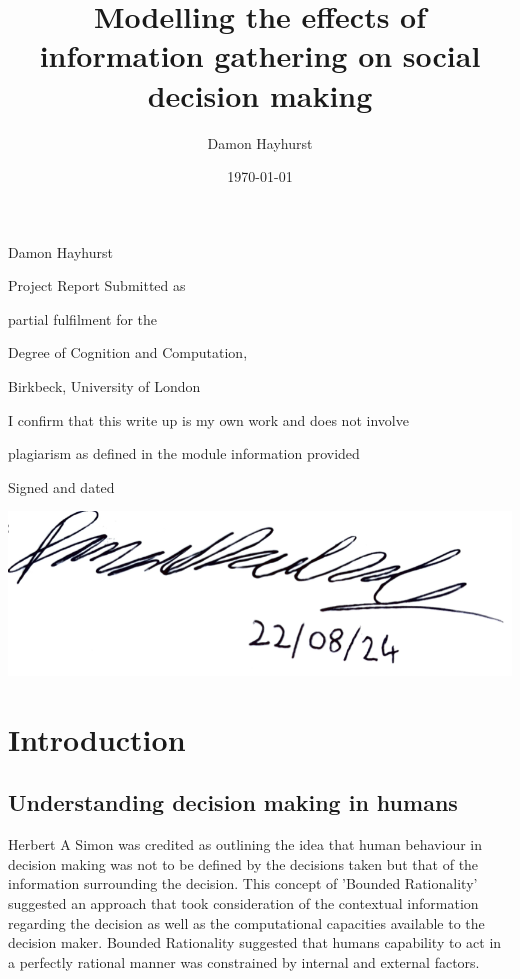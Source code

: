 \documentclass[man, floatsintext]{apa7}
\title{Modelling the effects of information gathering on social decision making}
\author{Damon Hayhurst}
\date{\today}
\makeatletter
\renewcommand{\maketitle}{
	\begin{titlepage}
		\centering
		\vspace*{0.4in}
		{\Huge \bfseries \@title \par}
		\vspace{0.2in}
		{\LARGE Damon Hayhurst \par}
		\vspace{0.3in}
		{\Large Project Report Submitted as\par}
		{\Large partial fulfilment for the\par}
		{\Large Degree of Cognition and Computation,\par}
		\vfill
		{\Large Birkbeck, University of London\par}
		{\Large \@date \par}
		\vfill
		{\Large
			\begin{center}
				I confirm that this write up is my own work and does not involve\par
				plagiarism as defined in the module information provided
			\end{center}
		}
		{\Large Signed and dated\par}
		\includegraphics[width=0.5\linewidth]{figures/sig.png}
	\end{titlepage}
}
\makeatother
\begin{document}
\raggedbottom
\maketitle


\abstract










\section{Introduction}

\subsection{Understanding decision making in humans}

Herbert A Simon was credited as outlining the idea that human behaviour in decision making was not to be defined by the decisions taken but that of the information surrounding the decision.  This concept of 'Bounded Rationality' suggested an approach that took consideration of the contextual information regarding the decision as well as the computational capacities available to the decision maker.  Bounded Rationality suggested that humans capability to act in a perfectly rational manner was constrained by internal and external factors.
\end{document}
